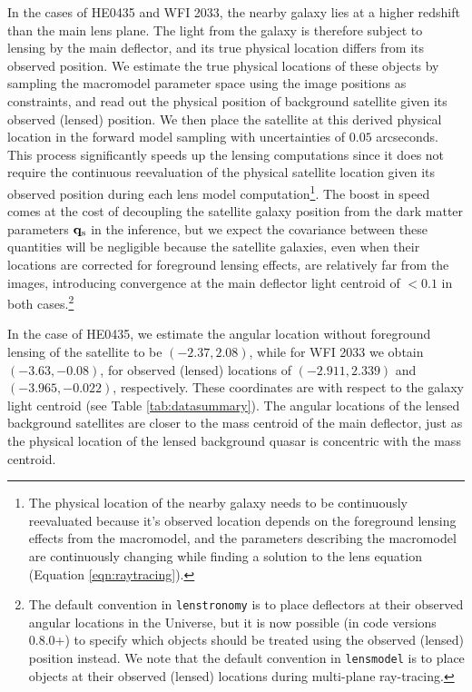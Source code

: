 In the cases of HE0435 and WFI 2033, the nearby galaxy lies at a higher redshift than the main lens plane. The light from the galaxy is therefore subject to lensing by the main deflector, and its true physical location differs from its observed position. We estimate the true physical locations of these objects by sampling the macromodel parameter space using the image positions as constraints, and read out the physical position of background satellite given its observed (lensed) position. We then place the satellite at this derived physical location in the forward model sampling with uncertainties of $0.05$ arcseconds. This process significantly speeds up the lensing computations since it does not require the continuous reevaluation of the physical satellite location given its observed position during each lens model computation\footnote{The physical location of the nearby galaxy needs to be continuously reevaluated because it's observed location depends on the foreground lensing effects from the macromodel, and the parameters describing the macromodel are continuously changing while finding a solution to the lens equation (Equation \ref{eqn:raytracing}).}. The boost in speed comes at the cost of decoupling the satellite galaxy position from the dark matter parameters ${\bf{q}_{\rm{s}}}$ in the inference, but we expect the covariance between these quantities will be negligible because the satellite galaxies, even when their locations are corrected for foreground lensing effects, are relatively far from the images, introducing convergence at the main deflector light centroid of $< 0.1$ in both cases.\footnote{The default convention in {\tt{lenstronomy}} is to place deflectors at their observed angular locations in the Universe, but it is now possible (in code versions 0.8.0+) to specify which objects should be treated using the observed (lensed) position instead. We note that the default convention in {\tt{lensmodel}} \citep{Keeton++97} is to place objects at their observed (lensed) locations during multi-plane ray-tracing.}

In the case of HE0435, we estimate the angular location without foreground lensing of the satellite to be $(-2.37, 2.08)$, while for WFI 2033 we obtain $(-3.63, -0.08)$, for observed (lensed) locations of $(-2.911, 2.339)$ and $(-3.965, -0.022)$, respectively. These coordinates are with respect to the galaxy light centroid (see Table \ref{tab:datasummary}). The angular locations of the lensed background satellites are closer to the mass centroid of the main deflector, just as the physical location of the lensed background quasar is concentric with the mass centroid.  

